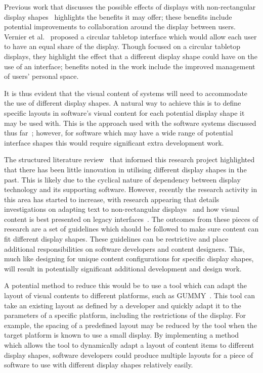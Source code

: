 \documentclass[twocolumn,compsoc]{cvm}
\begin{document}
Previous work that discusses the possible effects of displays with non-rectangular display shapes~\cite{Vernier2002} highlights the benefits it may offer; these benefits include potential improvements to collaboration around the display between users.
Vernier et al.~\cite{Vernier2002} proposed a circular tabletop interface which would allow each user to have an equal share of the display.
Though focused on a circular tabletop displays, they highlight the effect that a different display shape could have on the use of an interface; benefits noted in the work include the improved management of users' personal space.

It is thus evident that the visual content of systems will need to accommodate the use of different display shapes.
A natural way to achieve this is to define specific layouts in software's visual content for each potential display shape it may be used with.
This is the approach used with the software systems discussed thus far~\cite{Hansen2009,Shen2004}; however, for software which may have a wide range of potential interface shapes this would require significant extra development work.

The structured literature review~\cite{Kitchenham2004} that informed this research project highlighted that there has been little innovation in utilising different display shapes in the past.
This is likely due to the cyclical nature of dependency between display technology and its supporting software.
However, recently the research activity in this area has started to increase, with research appearing that details investigations on adapting text to non-rectangular displays~\cite{Serrano2016} and how visual content is best presented on legacy interfaces~\cite{Serrano2017}.
The outcomes from these pieces of research are a set of guidelines which should be followed to make sure content can fit different display shapes.
These guidelines can be restrictive and  place additional responsibilities on software developers and content designers.
This, much like designing for unique content configurations for specific display shapes, will result in potentially significant additional development and design work.

A potential method to reduce this would be to use a tool which can adapt the layout of visual contents to different platforms, such as GUMMY~\cite{Meskens2008}.
This tool can take an existing layout as defined by a developer and quickly adapt it to the parameters of a specific platform, including the restrictions of the display.
For example, the spacing of a predefined layout may be reduced by the tool when the target platform is known to use a small display.
By implementing a method which allows the tool to dynamically adapt a layout of content items to different display shapes, software developers could produce multiple layouts for a piece of software to use with different display shapes relatively easily.
\end{document}

